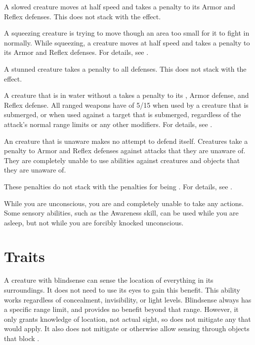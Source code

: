    A slowed creature moves at half speed and takes a  penalty to its Armor and Reflex defenses.
  This does not stack with the \immobilized effect.

   A squeezing creature is trying to move though an area too small for it to fight in normally.
  While squeezing, a creature moves at half speed and takes a  penalty to its Armor and Reflex defenses.
  For details, see .

   A stunned creature takes a  penalty to all defenses.
  This does not stack with the \confused effect.

   A creature that is in water without a  takes a  penalty to its , Armor defense, and Reflex defense.
  All ranged weapons have  of 5/15 when used by a creature that is submerged, or when used against a target that is submerged, regardless of the attack's normal range limits or any other modifiers.
  For details, see .

   An creature that is unaware makes no attempt to defend itself.
  Creatures take a  penalty to Armor and Reflex defenses against attacks that they are unaware of.
  They are completely unable to use  abilities against creatures and objects that they are unaware of.

  These penalties do not stack with the penalties for being \partiallyunaware.
  For details, see .

   While you are unconscious, you are \helpless and completely unable to take any actions.
  Some sensory abilities, such as the Awareness skill, can be used while you are asleep, but not while you are forcibly knocked unconscious.

  \newpage
\section{Traits}\label{Traits}

  A creature with blindsense can sense the location of everything in its surroundings.
  It does not need to use its eyes to gain this benefit.
  This ability works regardless of concealment, invisibility, or light levels.
  Blindsense always has a specific range limit, and provides no benefit beyond that range.
  However, it only grants knowledge of location, not actual sight, so does not mitigate any  that would apply.
  It also does not mitigate  or otherwise allow sensing through objects that block .

